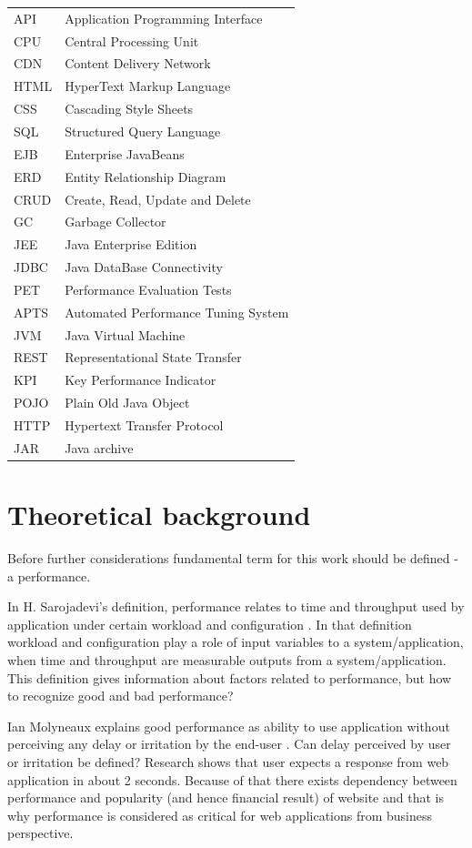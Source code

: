 \documentclass[10pt,a4paper]{article}
\begin{document}
\def\arraystretch{1.5}
\begin{tabularx}{\textwidth}{p{1.5cm}X}
API & Application Programming Interface\\ 
CPU & Central Processing Unit\\ 
CDN & Content Delivery Network\\
HTML & HyperText Markup Language\\ 
CSS & Cascading Style Sheets\\ 
SQL & Structured Query Language\\ 
EJB & Enterprise JavaBeans\\ 
ERD & Entity Relationship Diagram\\ 
CRUD & Create, Read, Update and Delete\\ 
GC & Garbage Collector\\ 
JEE & Java Enterprise Edition\\
JDBC & Java DataBase Connectivity\\ 
PET & Performance Evaluation Tests \\ 
APTS & Automated Performance Tuning System \\ 
JVM & Java Virtual Machine\\ 
REST & Representational State Transfer \\ 
KPI & Key Performance Indicator\\
POJO & Plain Old Java Object\\
HTTP & Hypertext Transfer Protocol\\ 
JAR & Java archive\\
\end{tabularx}



\section{Theoretical background}
Before further considerations fundamental term for this work should be defined  - a performance. 

In H. Sarojadevi's definition, performance relates to time and throughput used by application under certain workload and configuration \cite{petmethodsandtools}. In that definition workload and configuration play a role of input variables to a system/application, when time and throughput are measurable outputs from a system/application. This definition gives information about factors related to performance, but how to recognize good and bad performance?

Ian Molyneaux explains good performance as ability to use application without perceiving any delay or irritation by the end-user \cite{artperformance}. Can delay perceived by user or irritation be defined? Research \cite{howlong} shows that user expects a response from web application in about 2 seconds. Because of that there exists dependency between performance and popularity (and hence financial result) of website and that is why performance is  considered as critical for web applications from business perspective\cite{architectingperformance}. 
\end{document}
